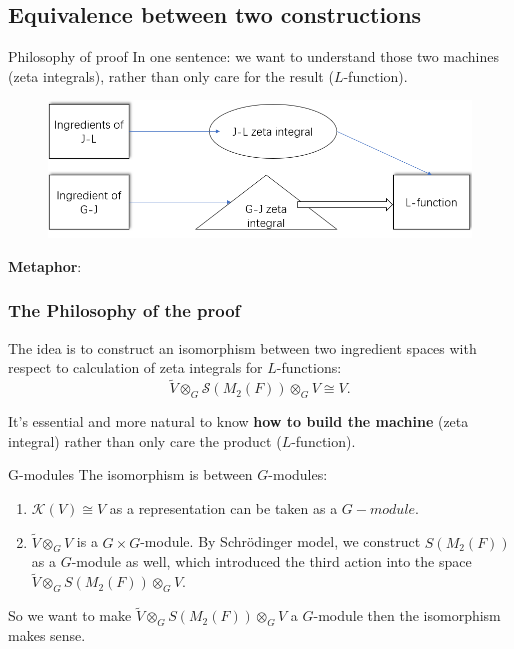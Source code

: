 \documentclass[aspectratio=169]{beamer}
\theoremstyle{plain}
\theoremstyle{definition}
\theoremstyle{remark}
\begin{document}
\subsection{Equivalence between two constructions}
\begin{frame}{Philosophy of proof}
    In one sentence: we want to understand those two machines (zeta integrals), rather than only care for the result ($L$-function).
    \begin{figure}
        \centering
        \includegraphics[scale= 0.37]{machine.png}
        \label{fig.machine}
    \end{figure}
    \vspace{0.3 cm}
    
    \textbf{Metaphor}:
\begin{center}
\end{center}
\end{frame}

\begin{frame}
\frametitle{The Philosophy of the proof}



The idea is to construct an isomorphism between two ingredient spaces with respect to calculation of zeta integrals for $L$-functions: $$\widetilde{V}\otimes_{G}\mathcal{S}(M_{2}(F))\otimes_{G} V\cong V.$$
\vspace{0.1 cm}

It's essential and more natural to know \textbf{how to build the machine} (zeta integral) rather than only care the product ($L$-function).
\end{frame}

\begin{frame}{G-modules}
    The isomorphism is between $G$-modules:
    \begin{enumerate}
        \item $\mathcal{K}(V)\cong V$ as a representation can be taken as a $G-module$.
        \item $\widetilde{V}\otimes_{G} V$ is a $G\times G$-module. By Schr\"odinger model, we construct $S(M_{2}(F))$ as a $G$-module as well, which introduced the third action into the space $\widetilde{V}\otimes_{G}S(M_{2}(F))\otimes_{G}V$. 
    \end{enumerate}
    
So we want to make $\widetilde{V}\otimes_{G}S(M_{2}(F))\otimes_{G}V$ a $G$-module then the isomorphism makes sense.
\end{frame}
\end{document}
